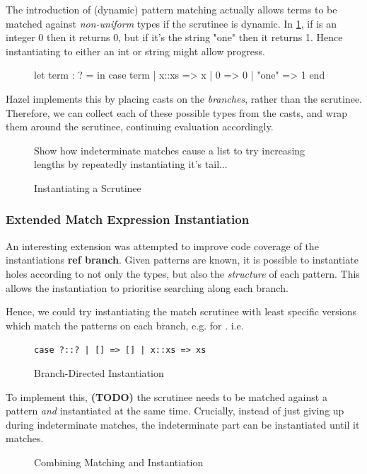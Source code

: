 The introduction of (dynamic) pattern matching actually allows terms to be matched against \textit{non-uniform} types if the scrutinee is dynamic. In \cref{fig:DynamicPatternMatching}, if  is an integer 0 then it returns 0, but if it's the string "one" then it returns 1. Hence instantiating  to either an int or string might allow progress.

\begin{figure}[h]
let term : ? =   in
case term 
  | x::xs => x
  | 0 => 0
| "one" => 1 end 
\label{fig:DynamicPatternMatching}
\end{figure}

Hazel implements this by placing casts on the \textit{branches}, rather than the scrutinee. Therefore, we can collect each of these possible types from the casts, and wrap them around the scrutinee, continuing evaluation accordingly.


\begin{figure}
Show how indeterminate matches cause a list to try increasing lengths by repeatedly instantiating it's tail...
\caption{Instantiating a Scrutinee}
\end{figure}

\subsubsection{Extended Match Expression Instantiation}
\label{sec:ExtendedPatternMatching}
An interesting extension was attempted to improve code coverage of the instantiations \textbf{ref branch}. Given patterns are known, it is possible to instantiate holes according to not only the types, but also the \textit{structure} of each pattern. This allows the instantiation to prioritise searching along each branch.

Hence, we could try instantiating the match scrutinee with least specific versions which match the patterns on each branch, e.g.  for . i.e. 

\begin{figure}
\texttt{case ?::? | [] => [] | x::xs => xs}
\caption{Branch-Directed Instantiation}
\end{figure}

To implement this, \textbf{(TODO)} the scrutinee needs to be matched against a pattern \textit{and} instantiated at the same time. Crucially, instead of just giving up during indeterminate matches, the indeterminate part can be instantiated until it matches.

\begin{figure}[H]
\caption{Combining Matching and Instantiation}
\end{figure}

